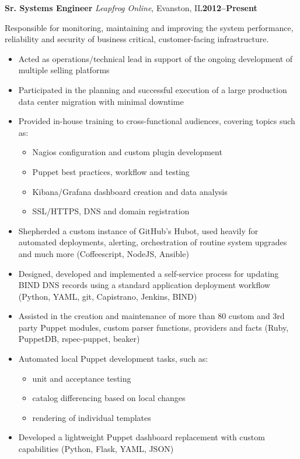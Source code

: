 \documentclass[10pt,letterpaper]{article}
\newcommand{\cventry}[5]{%
{\bfseries{#2}} {\small{\textit{#3}, #4}}\hfill {\small\bfseries{#1}}
\begin{small}\begin{adjustwidth}{1em}{2em}{\raggedright{#5}}\end{adjustwidth}\end{small}
}
\begin{document}
\cventry{2012--Present}{Sr. Systems Engineer}{Leapfrog Online}{Evanston, IL}{%
{Responsible for monitoring, maintaining and improving the system performance,
reliability and security of business critical, customer-facing infrastructure.}

\begin{itemize}
\item Acted as operations/technical lead in support of the ongoing
      development of multiple selling platforms
\item Participated in the planning and successful execution of a large
      production data center migration with minimal downtime
\item Provided in-house training to cross-functional audiences, covering
      topics such as:
\begin{itemize}
  \item Nagios configuration and custom plugin development
  \item Puppet best practices, workflow and testing
  \item Kibana/Grafana dashboard creation and data analysis
  \item SSL/HTTPS, DNS and domain registration
\end{itemize}
\item Shepherded a custom instance of GitHub's Hubot, used heavily for
      automated deployments, alerting, orchestration of routine system
      upgrades and much more (Coffeescript, NodeJS, Ansible)
\item Designed, developed and implemented a self-service process for updating
      BIND DNS records using a standard application deployment workflow (Python,
      YAML, git, Capistrano, Jenkins, BIND)
\item Assisted in the creation and maintenance of more than 80 custom and 3rd
      party Puppet modules, custom parser functions, providers and facts (Ruby,
      PuppetDB, rspec-puppet, beaker)
\item Automated local Puppet development tasks, such as:
  \begin{itemize}
    \item unit and acceptance testing
    \item catalog differencing based on local changes
    \item rendering of individual templates
  \end{itemize}
\item Developed a lightweight Puppet dashboard replacement with custom
      capabilities (Python, Flask, YAML, JSON)

\end{itemize}}
\end{document}
